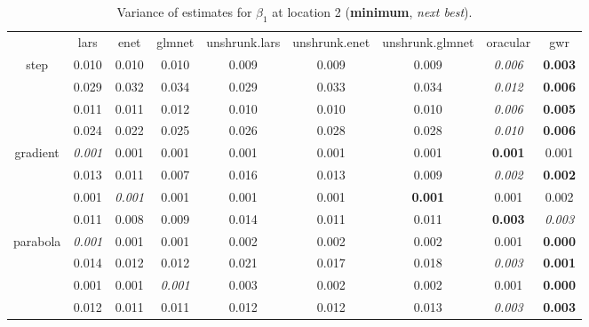 \documentclass[authoryear, review, 11pt]{elsarticle}
\begin{document}
\begin{table}[ht]
\begin{center}
\begin{tabular}{ccccccccc}
  & lars & enet & glmnet & unshrunk.lars & unshrunk.enet & unshrunk.glmnet & oracular & gwr \\ 
  \cline{2-9}
  \multirow{4}{*}{step} & 0.010 & 0.010 & 0.010 & 0.009 & 0.009 & 0.009 & \emph{0.006} & \textbf{0.003} \\ 
  & 0.029 & 0.032 & 0.034 & 0.029 & 0.033 & 0.034 & \emph{0.012} & \textbf{0.006} \\ 
  & 0.011 & 0.011 & 0.012 & 0.010 & 0.010 & 0.010 & \emph{0.006} & \textbf{0.005} \\ 
  & 0.024 & 0.022 & 0.025 & 0.026 & 0.028 & 0.028 & \emph{0.010} & \textbf{0.006} \\ 
  \cline{2-9}
  \multirow{4}{*}{gradient} & \emph{0.001} & 0.001 & 0.001 & 0.001 & 0.001 & 0.001 & \textbf{0.001} & 0.001 \\ 
  & 0.013 & 0.011 & 0.007 & 0.016 & 0.013 & 0.009 & \emph{0.002} & \textbf{0.002} \\ 
  & 0.001 & \emph{0.001} & 0.001 & 0.001 & 0.001 & \textbf{0.001} & 0.001 & 0.002 \\ 
  & 0.011 & 0.008 & 0.009 & 0.014 & 0.011 & 0.011 & \textbf{0.003} & \emph{0.003} \\ 
  \cline{2-9}
  \multirow{4}{*}{parabola} & \emph{0.001} & 0.001 & 0.001 & 0.002 & 0.002 & 0.002 & 0.001 & \textbf{0.000} \\ 
  & 0.014 & 0.012 & 0.012 & 0.021 & 0.017 & 0.018 & \emph{0.003} & \textbf{0.001} \\ 
  & 0.001 & 0.001 & \emph{0.001} & 0.003 & 0.002 & 0.002 & 0.001 & \textbf{0.000} \\ 
  & 0.012 & 0.011 & 0.011 & 0.012 & 0.012 & 0.013 & \emph{0.003} & \textbf{0.003} \\ 
  \end{tabular}
\caption{Variance of estimates for $\beta_1$ at location 2 (\textbf{minimum}, \emph{next best}).\label{table:loc2-X1-varx}}
\end{center}
\end{table}
\end{document}
